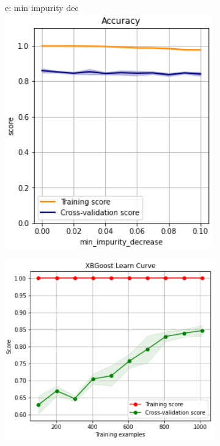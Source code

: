 \documentclass{article}
\begin{document}
\begin{figure}
\begin{subfigure}{.19\textwidth}
	\end{subfigure}
	\begin{subfigure}{.19\textwidth}
		\centering
		e: min impurity dec\\
		\includegraphics[width=\linewidth]{poland_xgb_min_impurity_decrease_accuracy.png}
		
	\end{subfigure}
	\begin{subfigure}{0.35\textwidth}
		\centering
		\includegraphics[width=\linewidth]{poland_xgb_learning_curve.png}
		
	\end{subfigure}
	\label{fig:test}
\end{figure}
\end{document}
